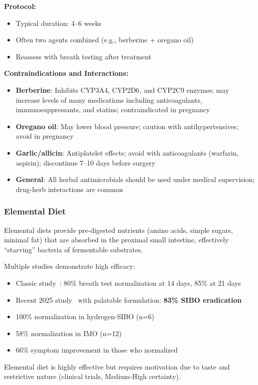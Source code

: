 \textbf{Protocol:}
\begin{itemize}
    \item Typical duration: 4--6 weeks
    \item Often two agents combined (e.g., berberine + oregano oil)
    \item Reassess with breath testing after treatment
\end{itemize}

\textbf{Contraindications and Interactions:}
\begin{itemize}
    \item \textbf{Berberine}: Inhibits CYP3A4, CYP2D6, and CYP2C9 enzymes; may increase levels of many medications including anticoagulants, immunosuppressants, and statins; contraindicated in pregnancy
    \item \textbf{Oregano oil}: May lower blood pressure; caution with antihypertensives; avoid in pregnancy
    \item \textbf{Garlic/allicin}: Antiplatelet effects; avoid with anticoagulants (warfarin, aspirin); discontinue 7--10 days before surgery
    \item \textbf{General}: All herbal antimicrobials should be used under medical supervision; drug-herb interactions are common
\end{itemize}

\subsubsection{Elemental Diet}

Elemental diets provide pre-digested nutrients (amino acids, simple sugars, minimal fat) that are absorbed in the proximal small intestine, effectively ``starving'' bacteria of fermentable substrates.

\begin{observation}
\label{obs:elemental-diet}
Multiple studies demonstrate high efficacy:
\begin{itemize}
    \item Classic study~\cite{PimentelElemental2004}: 80\% breath test normalization at 14 days, 85\% at 21 days
    \item Recent 2025 study~\cite{ElementalDiet2025} with palatable formulation: \textbf{83\% SIBO eradication}
    \item 100\% normalization in hydrogen-SIBO (n=6)
    \item 58\% normalization in IMO (n=12)
    \item 66\% symptom improvement in those who normalized
\end{itemize}
Elemental diet is highly effective but requires motivation due to taste and restrictive nature (clinical trials, Medium-High certainty).
\end{observation}


